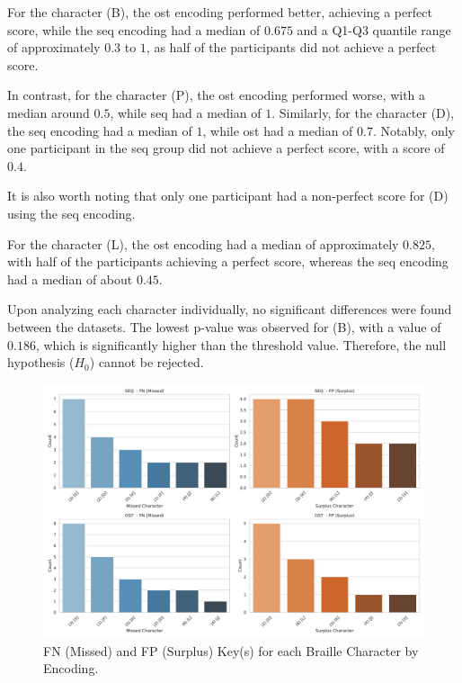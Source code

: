 For the character (B), the \gls{ost} encoding performed better, achieving a perfect score, while the \gls{seq} encoding had a median of $0.675$ and a Q1-Q3 quantile range of approximately $0.3$ to $1$, as half of the participants did not achieve a perfect score.

In contrast, for the character (P), the \gls{ost} encoding performed worse, with a median around $0.5$, while \gls{seq} had a median of $1$. Similarly, for the character (D), the \gls{seq} encoding had a median of $1$, while \gls{ost} had a median of $0.7$. Notably, only one participant in the \gls{seq} group did not achieve a perfect score, with a score of $0.4$.

It is also worth noting that only one participant had a non-perfect score for (D) using the \gls{seq} encoding.

For the character (L), the \gls{ost} encoding had a median of approximately $0.825$, with half of the participants achieving a perfect score, whereas the \gls{seq} encoding had a median of about $0.45$.

Upon analyzing each character individually, no significant differences were found between the datasets. The lowest p-value was observed for (B), with a value of $0.186$, which is significantly higher than the threshold value. Therefore, the null hypothesis ($H_0$) cannot be rejected.

\begin{figure}
    \centering
    \includegraphics[width=\linewidth]{src/pictures/Study2Data_Experiment/Eval/sjkne_OST.pdf}
    \caption{FN (Missed) and FP (Surplus) Key(s) for each Braille Character by Encoding.}
    \label{fig:missedSurplus_study2}
\end{figure}

